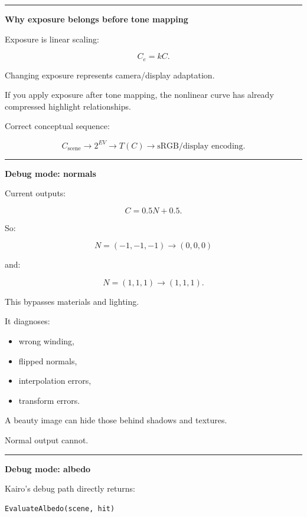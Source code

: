 \begin{center}\rule{0.5\linewidth}{0.5pt}\end{center}

\textbf{Why exposure belongs before tone mapping}

Exposure is linear scaling:

\[
C_e=kC.
\]

Changing exposure represents camera/display adaptation.

If you apply exposure after tone mapping, the nonlinear curve has already compressed highlight relationships.

Correct conceptual sequence:

\[
\boxed{
C_{\text{scene}}
\rightarrow
2^{EV}
\rightarrow
T(C)
\rightarrow
\text{sRGB/display encoding}.
}
\]

\begin{center}\rule{0.5\linewidth}{0.5pt}\end{center}

\textbf{Debug mode: normals}

Current  outputs:

\[
\boxed{
C=
0.5N+0.5.
}
\]

So:

\[
N=(-1,-1,-1)
\rightarrow
(0,0,0)
\]

and:

\[
N=(1,1,1)
\rightarrow
(1,1,1).
\]

This bypasses materials and lighting.

It diagnoses:

\begin{itemize}
\tightlist
\item
  wrong winding,
\item
  flipped normals,
\item
  interpolation errors,
\item
  transform errors.
\end{itemize}

A beauty image can hide those behind shadows and textures.

Normal output cannot.

\begin{center}\rule{0.5\linewidth}{0.5pt}\end{center}

\textbf{Debug mode: albedo}

Kairo's debug path directly returns:

\begin{verbatim}
EvaluateAlbedo(scene, hit)
\end{verbatim}

